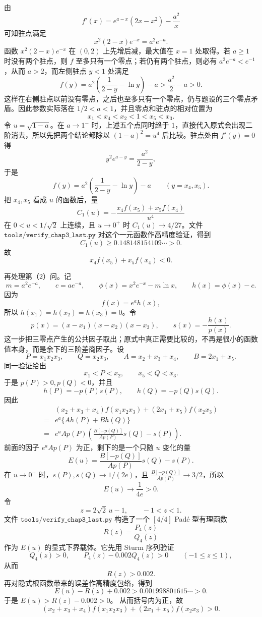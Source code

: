 \begin{solution}
由
\[
f'(x)=e^{a-x}(2x-x^2)-\frac{a^2}{x}
\]
可知驻点满足
\[
x^2(2-x)e^{-x}=a^2e^{-a}.
\]
函数 \(x^2(2-x)e^{-x}\) 在 \((0,2)\) 上先增后减，最大值在 \(x=1\) 处取得。若 \(a\ge1\) 时没有两个驻点，则 \(f\) 至多只有一个零点；若仍有两个驻点，则必有 \(a^2e^{-a}<e^{-1}\)，从而 \(a>2\)，而左侧驻点 \(y<1\) 处满足
\[
f(y)=a^2\left(\frac1{2-y}-\ln y\right)-a>\frac{a^2}{2}-a>0.
\]
这样在右侧驻点以前没有零点，之后也至多只有一个零点，仍与题设的三个零点矛盾。因此参数实际落在 \(1/2<a<1\)，并且零点和驻点的相对位置为
\[
x_1<x_4<x_2<1<x_5<x_3 .
\]
令 \(u=\sqrt{1-a}\)。在 \(a\to1^-\) 时，上述五个点同时趋于 \(1\)，直接代入原式会出现二阶消去，所以先把两个结论都除以 \((1-a)^2=u^4\) 后比较。驻点处由 \(f'(y)=0\) 得
\[
y^2e^{a-y}=\frac{a^2}{2-y},
\]
于是
\[
f(y)=a^2\left(\frac1{2-y}-\ln y\right)-a\qquad(y=x_4,x_5).
\]
把 \(x_4,x_5\) 看成 \(u\) 的函数后，量
\[
C_1(u)=-\frac{x_4f(x_5)+x_5f(x_4)}{u^4}
\]
在 \(0<u<1/\sqrt2\) 上连续，且 \(u\to0^+\) 时 \(C_1(u)\to4/27\)。文件 \(\texttt{tools/verify\_chap3\_last.py}\) 对这个一元函数作高精度验证，得到
\[
C_1(u)\ge 0.148148154109\cdots>0.
\]
故
\[
x_4f(x_5)+x_5f(x_4)<0.
\]

再处理第（2）问。记
\[
m=a^2e^{-a},\qquad c=ae^{-a},\qquad
\phi(x)=x^2e^{-x}-m\ln x,\qquad h(x)=\phi(x)-c .
\]
因为
\[
f(x)=e^a h(x),
\]
所以 \(h(x_1)=h(x_2)=h(x_3)=0\)。令
\[
p(x)=(x-x_1)(x-x_2)(x-x_3),\qquad
s(x)=-\frac{h(x)}{p(x)} .
\]
这一步把三零点产生的公共因子取出；原式中真正需要比较的，不再是很小的函数值本身，而是余下的三阶差商因子。设
\[
P=x_1x_2x_3,\qquad Q=x_2x_3,\qquad
A=x_2+x_3+x_4,\qquad B=2x_1+x_5 .
\]
同一验证给出
\[
x_1<P<x_2,\qquad x_5<Q<x_3 .
\]
于是 \(p(P)>0,p(Q)<0\)，并且
\[
h(P)=-p(P)s(P),\qquad h(Q)=-p(Q)s(Q).
\]
因此
\begin{align*}
& (x_2+x_3+x_4) f(x_1x_2x_3)+(2x_1+x_5) f(x_2x_3)\\
={}&e^a\{Ah(P)+Bh(Q)\}\\
={}&e^a A p(P)\left(\frac{B[-p(Q)]}{A p(P)}s(Q)-s(P)\right).
\end{align*}
前面的因子 \(e^a A p(P)\) 为正，剩下的是一个只随 \(u\) 变化的量
\[
E(u)=\frac{B[-p(Q)]}{A p(P)}s(Q)-s(P).
\]
在 \(u\to0^+\) 时，\(s(P),s(Q)\to1/(2e)\)，且 \(\frac{B[-p(Q)]}{A p(P)}\to3/2\)，所以
\[
E(u)\to\frac1{4e}>0.
\]
令
\[
z=2\sqrt2\,u-1,\qquad -1<z<1.
\]
文件 \(\texttt{tools/verify\_chap3\_last.py}\) 构造了一个 \([4/4]\) Padé 型有理函数
\[
R(z)=\frac{P_4(z)}{Q_4(z)}
\]
作为 \(E(u)\) 的显式下界载体。它先用 Sturm 序列验证
\[
Q_4(z)>0,\qquad P_4(z)-0.002Q_4(z)>0\qquad(-1\le z\le1),
\]
从而
\[
R(z)>0.002.
\]
再对隐式根函数带来的误差作高精度包络，得到
\[
E(u)-R(z)+0.002>0.001998801615\cdots>0.
\]
于是 \(E(u)>R(z)-0.002>0\)。
从而括号内为正，故
\[
(x_2+x_3+x_4) f(x_1x_2x_3)+(2x_1+x_5) f(x_2x_3)>0.
\]
\end{solution}

